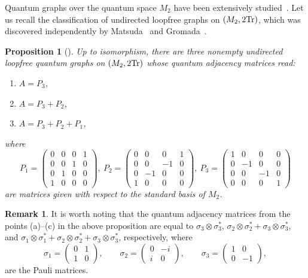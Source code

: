 \documentclass{amsart}
\newtheorem{proposition}[thm]{Proposition}
\theoremstyle{definition}
\newtheorem{remark}[thm]{Remark}
\theoremstyle{definition}
\begin{document}
Quantum graphs over the quantum space $M_2$ have been extensively studied~\cite{matsuda_classification_2022,gromada_examples_2022, kiefer_complete_2025}. Let us recall the classification of undirected loopfree graphs on $(M_2,2{\rm Tr})$, which was discovered independently by Matsuda~\cite{matsuda_classification_2022} and Gromada~\cite{gromada_examples_2022}.
\begin{proposition}[{\cite[Proposition~3.14]{gromada_examples_2022}}]\label{prop::gromada_tweaked}
    Up to isomorphism, there are three nonempty undirected loopfree quantum graphs on $(M_2,2{\rm Tr})$ whose quantum adjacency matrices read:
    \begin{enumerate}
\item $A=P_3$,
\item $A=P_3+P_2$,
\item $A=P_3+P_2+P_1$,
    \end{enumerate}
    where
  \[
P_1=\begin{pmatrix}
    0 & 0 & 0 & 1\\
    0 & 0 & 1 & 0\\
    0 & 1 & 0 & 0\\
    1 & 0 & 0 & 0
\end{pmatrix},~
P_2=\begin{pmatrix}
    0 & 0 & 0 & 1\\
    0 & 0 & -1 & 0\\
    0 & -1 & 0 & 0\\
    1 & 0 & 0 & 0
\end{pmatrix},~
P_3=\begin{pmatrix}
    1 & 0 & 0 & 0\\
    0 & -1 & 0 & 0\\
    0 & 0 & -1 & 0\\
    0 & 0 & 0 & 1
\end{pmatrix}
\]
are matrices given with respect to the standard basis of $M_2$.
\end{proposition}
\begin{remark}
It is worth noting that the quantum adjacency matrices from the points (a)--(c) in the above proposition are equal to $\sigma_3\otimes\sigma_3^*$, $\sigma_2\otimes\sigma_2^*+\sigma_3\otimes\sigma_3^*$, and $\sigma_1\otimes\sigma_1^*+\sigma_2\otimes\sigma_2^*+\sigma_3\otimes\sigma_3^*$, respectively, where
\[
\sigma_1=\begin{pmatrix}0 & 1\\1 & 0\end{pmatrix},\qquad \sigma_2=\begin{pmatrix}0 & -i\\i & 0\end{pmatrix}, \qquad \sigma_3=\begin{pmatrix}1 & 0\\0 & -1\end{pmatrix},
\]
are the Pauli matrices.
\end{remark}
\end{document}
